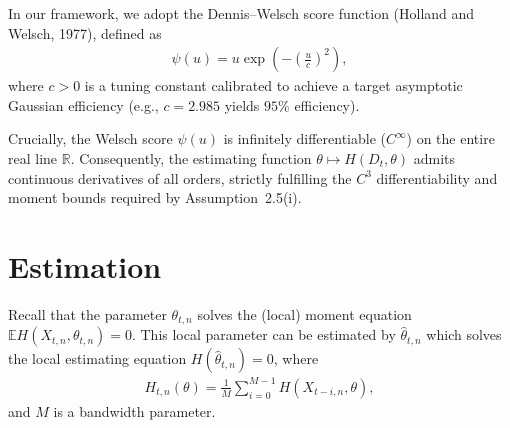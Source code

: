 \documentclass[10pt, a4paper]{article}
\theoremstyle{assumption}
\theoremstyle{definition}
\theoremstyle{theorem}
\newcommand{\E}{\mathbb{E}}
\begin{document}
In our framework, we adopt the Dennis--Welsch score function (Holland and Welsch, 1977), defined as
\begin{align*}
    \psi(u) = u \exp\left( -\left(\frac{u}{c}\right)^2 \right),
\end{align*}
where $c > 0$ is a tuning constant calibrated to achieve a target asymptotic Gaussian efficiency (e.g., $c = 2.985$ yields $95\%$ efficiency). 

Crucially, the Welsch score $\psi(u)$ is infinitely differentiable ($C^\infty$) on the entire real line $\mathbb{R}$. Consequently, the estimating function $\theta \mapsto H(D_t, \theta)$ admits continuous derivatives of all orders, strictly fulfilling the $C^3$ differentiability and moment bounds required by Assumption~2.5(i).


\section{Estimation}

Recall that the parameter $\theta_{t,n}$ solves the (local) moment equation $\E H(X_{t,n}, \theta_{t,n})=0$.
This local parameter can be estimated by $\widehat{\theta}_{t,n}$ which solves the local estimating equation $H(\widehat{\theta}_{t,n})=0$, where
\begin{align}
    H_{t,n}(\theta) = \frac{1}{M}\sum_{i=0}^{M-1} H(X_{t-i,n},\theta),\label{eqn:local-estimating-equation}
\end{align}
and $M$ is a bandwidth parameter.
\end{document}

